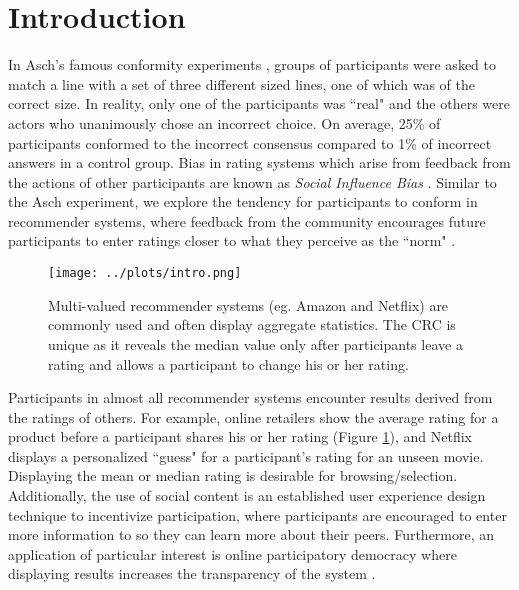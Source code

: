 \section{Introduction}
In Asch's famous conformity experiments \cite{asch1956studies, asch1955opinions, bond1996culture}, groups of participants were asked to match a line with a set of three different sized lines, one of which was of the correct size.
In reality, only one of the participants was ``real" and the others were actors who unanimously chose an incorrect choice.
On average, 25\% of participants conformed to the incorrect consensus compared to 1\% of incorrect answers in a control group.
Bias in rating systems which arise from feedback from the actions of other participants are known as \emph{Social Influence Bias} \cite{demarzo2003persuasion, moscovici1972social, wood2000attitude}.
Similar to the Asch experiment, we explore the tendency for participants to conform in recommender systems, where feedback from the community encourages future participants to enter ratings closer to what they perceive as the ``norm" \cite{banerjee1992simple}.

\begin{figure}[t]
  \centering
    \texttt{[image: ../plots/intro.png]}
      \caption{Multi-valued recommender systems (eg. Amazon and Netflix) are commonly used and often display aggregate statistics. The CRC is unique as it reveals the median value only after participants leave a rating and allows a participant to change his or her rating.}
      \label{grading-0}
\end{figure}

Participants in almost all recommender systems encounter results derived from the ratings of others.
For example, online retailers show the average rating for a product before a participant shares his or her rating (Figure \ref{grading-0}), and Netflix displays a personalized ``guess" for a participant's rating for an unseen movie.
Displaying the mean or median rating is desirable for browsing/selection.
Additionally, the use of social content is an established user experience design technique to incentivize participation\cite{jian2012incentive, shneiderman1992designing}, where participants are encouraged to enter more information to so they can learn more about their peers.
Furthermore, an application of particular interest is online participatory democracy where displaying results increases the transparency of the system \cite{albors2008new,o2012transparency,noveck2008wiki}.

